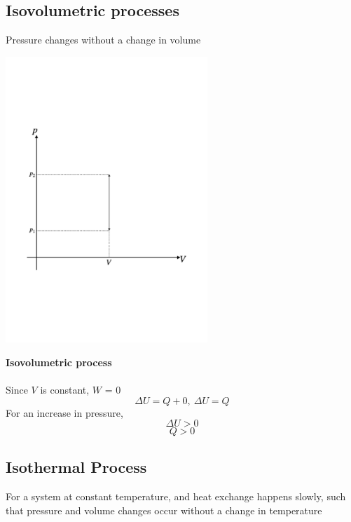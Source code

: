 \documentclass[a4paper, 10pt]{article}
\begin{document}
\subsection{Isovolumetric processes}
Pressure changes without a change in volume \\
\begin{minipage}{0.5\textwidth}
      \includegraphics[trim = 50 50 50 50, width=3in]{figures/isovolumetric_process.pdf} 
\end{minipage}	
\begin{minipage}{0.5\textwidth}
   \textbf{Isovolumetric process} \\ \\

   Since $V$ is constant, $W$ = 0
   \[
   \Delta U = Q + 0,\ \Delta U = Q
   \]
   For an increase in pressure, 
   \[
   \Delta U > 0
   \]
   \[
   Q > 0
   \]
\end{minipage}	

\subsection{Isothermal Process}
For a system at constant temperature, and heat exchange happens slowly, such that pressure and volume changes occur without a change in temperature \\
\end{document}
